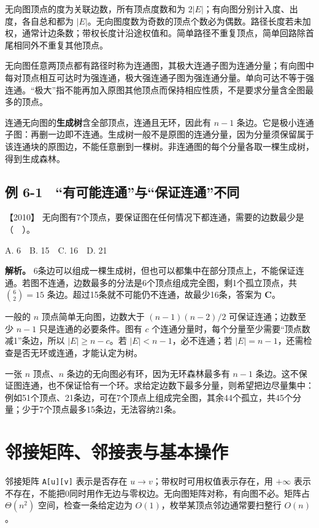 无向图顶点的度为关联边数，所有顶点度数和为 \(2|E|\)；有向图分别计入度、出度，各自总和都为 \(|E|\)。无向图度数为奇数的顶点个数必为偶数。路径长度若未加权，通常计边条数；带权长度计沿途权值和。简单路径不重复顶点，简单回路除首尾相同外不重复其他顶点。

无向图任意两顶点都有路径时称为连通图，其极大连通子图为连通分量；有向图中每对顶点相互可达时为强连通，极大强连通子图为强连通分量。单向可达不等于强连通。``极大''指不能再加入原图其他顶点而保持相应性质，不是要求分量含全图最多的顶点。

连通无向图的\textbf{生成树}含全部顶点，连通且无环，因此有 \(n-1\) 条边。它是极小连通子图：再删一边即不连通。生成树一般不是原图的连通分量，因为分量须保留属于该连通块的原图边，不能任意删到一棵树。非连通图的每个分量各取一棵生成树，得到生成森林。

\subsection{例 6-1　``有可能连通''与``保证连通''不同}\label{ds-ex6-1}

\noindent{}【2010】 无向图有7个顶点，要保证图在任何情况下都连通，需要的边数最少是（　）。

A. 6　B. 15　C. 16　D. 21


\textbf{解析。} 6条边可以组成一棵生成树，但也可以都集中在部分顶点上，不能保证连通。若图不连通，边数最多的分法是6个顶点组成完全图，剩1个孤立顶点，共 \(\binom62=15\) 条边。超过15条就不可能仍不连通，故最少16条，答案为 \textbf{C}。

一般的 \(n\) 顶点简单无向图，边数大于 \((n-1)(n-2)/2\) 可保证连通；边数至少 \(n-1\) 只是连通的必要条件。图有 \(c\) 个连通分量时，每个分量至少需要``顶点数减1''条边，所以 \(|E|\ge n-c\)。若 \(|E|<n-1\)，必不连通；若 \(|E|=n-1\)，还需检查是否无环或连通，才能认定为树。

一张 \(n\) 顶点、\(n\) 条边的无向图必有环，因为无环森林最多有 \(n-1\) 条边。这不保证图连通，也不保证恰有一个环。求给定边数下最多分量，则希望把边尽量集中：例如51个顶点、21条边，可在7个顶点上组成完全图，其余44个孤立，共45个分量；少于7个顶点最多15条边，无法容纳21条。

\section{邻接矩阵、邻接表与基本操作}\label{ds-06-02}

邻接矩阵 \allowbreak{}\texttt{A{[}u{]}{[}v{]}} 表示是否存在 \(u\to v\)；带权时可用权值表示存在，用 \(+\infty\) 表示不存在，不能把0同时用作无边与零权边。无向图矩阵对称，有向图不必。矩阵占 \(\Theta(n^2)\) 空间，检查一条给定边为 \(O(1)\)，枚举某顶点邻边通常要扫整行 \(O(n)\)。

